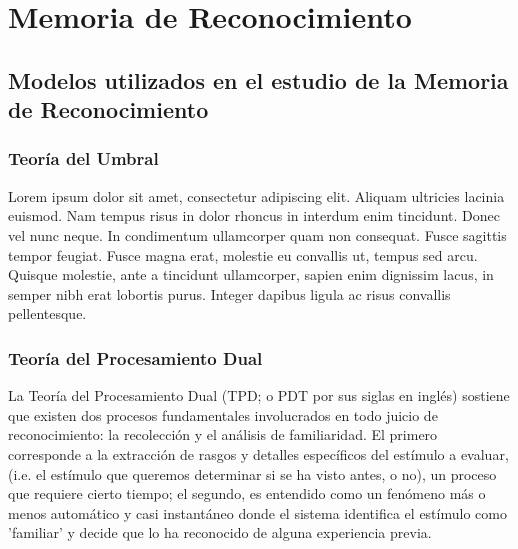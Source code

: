 
\chapter{Memoria de Reconocimiento} %

\label{Cap_RM} %


\section{Modelos utilizados en el estudio de la Memoria de Reconocimiento}

\subsection{Teoría del Umbral}

Lorem ipsum dolor sit amet, consectetur adipiscing elit. Aliquam ultricies lacinia euismod. Nam tempus risus in dolor rhoncus in interdum enim tincidunt. Donec vel nunc neque. In condimentum ullamcorper quam non consequat. Fusce sagittis tempor feugiat. Fusce magna erat, molestie eu convallis ut, tempus sed arcu. Quisque molestie, ante a tincidunt ullamcorper, sapien enim dignissim lacus, in semper nibh erat lobortis purus. Integer dapibus ligula ac risus convallis pellentesque.

\subsection{Teoría del Procesamiento Dual}

La Teoría del Procesamiento Dual (TPD; o PDT por sus siglas en inglés) sostiene que existen dos procesos fundamentales involucrados en todo juicio de reconocimiento: la recolección y el análisis de familiaridad. El primero corresponde a la extracción de rasgos y detalles específicos del estímulo a evaluar, (i.e. el estímulo que queremos determinar si se ha visto antes, o no), un proceso que requiere cierto tiempo; el segundo, es entendido como un fenómeno más o menos automático y casi instantáneo donde el sistema identifica el estímulo como 'familiar' y decide que lo ha reconocido de alguna experiencia previa. 

